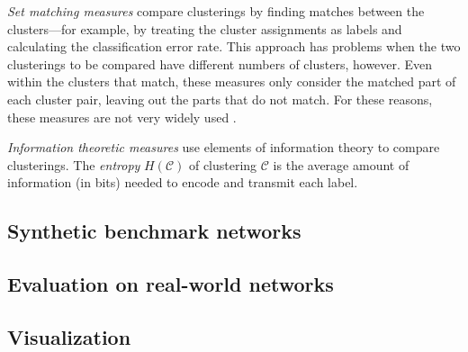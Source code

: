 \emph{Set matching measures} compare clusterings by finding matches
between the clusters---for example, by treating the cluster assignments
as labels and calculating the classification error rate. This approach
has problems when the two clusterings to be compared have different
numbers of clusters, however. Even within the clusters that match, these
measures only consider the matched part of each cluster pair, leaving
out the parts that do not match. For these reasons, these measures are
not very widely used
\autocites{meila_comparing_2007}{vinh_information_2010}.

\emph{Information theoretic measures} use elements of information theory
to compare clusterings. The \emph{entropy} \(H(\mathcal{C})\) of
clustering \(\mathcal{C}\) is the average amount of information (in
bits) needed to encode and transmit each label.

\subsection{Synthetic benchmark
networks}\label{synthetic-benchmark-networks}

\subsection{Evaluation on real-world
networks}\label{evaluation-on-real-world-networks}

\subsection*{Visualization}\label{visualization}
